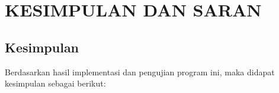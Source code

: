 
\chapter{KESIMPULAN DAN SARAN}

\section{Kesimpulan}
Berdasarkan hasil implementasi dan pengujian program ini, maka didapat kesimpulan sebagai berikut:

